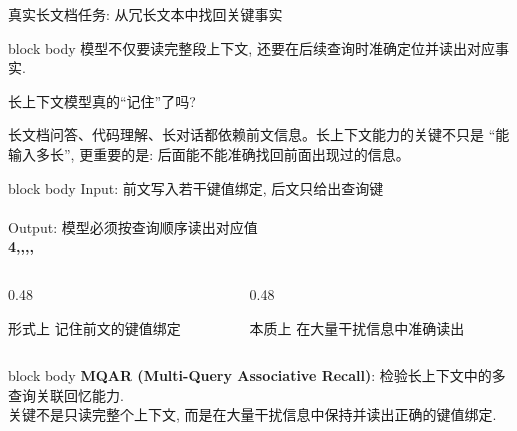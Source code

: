 \begin{frame}{真实长文档任务: 从冗长文本中找回关键事实}
\begin{minipage}{0.92\textwidth}
  \vskip0.34cm
  \begin{beamercolorbox}[sep=5pt,rounded=true,wd=\linewidth]{block body}
    \centering\small
    模型不仅要读完整段上下文, 还要在后续查询时准确定位并读出对应事实.
  \end{beamercolorbox}
  \end{minipage}
\end{frame}

\begin{frame}{长上下文模型真的“记住”了吗?}
  \centering
  \begin{minipage}{0.92\textwidth}
  \small
  长文档问答、代码理解、长对话都依赖前文信息。长上下文能力的关键不只是
  \textcolor{scured}{“能输入多长”}, 更重要的是: 后面能不能准确找回前面出现过的信息。

  \vskip0.32cm
  \begin{beamercolorbox}[sep=7pt,rounded=true,shadow=true,wd=\linewidth]{block body}
    \centering
    {\footnotesize\color{gray}Input: 前文写入若干键值绑定, 后文只给出查询键}\\[3pt]
    {}\\[5pt]
    {\footnotesize\color{gray}Output: 模型必须按查询顺序读出对应值}\\[3pt]
    {\Large\bfseries\color{scured}4,,,,}
  \end{beamercolorbox}

  \vskip0.30cm
  \begin{columns}[T,onlytextwidth]
    \begin{column}{0.48\linewidth}
      \begin{block}{形式上}
        \centering
        \vspace{0.12cm}
        记住前文的键值绑定
        \vspace{0.12cm}
      \end{block}
    \end{column}
    \begin{column}{0.48\linewidth}
      \begin{block}{本质上}
        \centering
        \vspace{0.12cm}
        在大量干扰信息中准确读出
        \vspace{0.12cm}
      \end{block}
    \end{column}
  \end{columns}

  \vskip0.12cm
  \begin{beamercolorbox}[sep=3pt,rounded=true,wd=\linewidth]{block body}
    \centering\small
    \textcolor{scured}{\bfseries MQAR (Multi-Query Associative Recall)}: 检验长上下文中的多查询关联回忆能力.\\[2pt]
    关键不是只读完整个上下文, 而是在大量干扰信息中保持并读出正确的键值绑定.
  \end{beamercolorbox}
  \end{minipage}
\end{frame}


